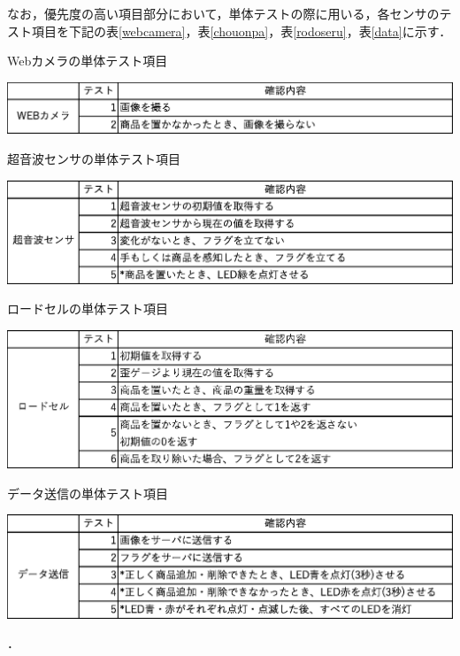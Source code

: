 なお，優先度の高い項目部分において，単体テストの際に用いる，各センサのテスト項目を下記の表\ref{webcamera}，表\ref{chouonpa}，表\ref{rodoseru}，表\ref{data}に示す．

\begin{table}[htbp]
\centering
\caption{Webカメラの単体テスト項目}
\includegraphics[width = 15cm]{./picture/webcamera.eps}
\label{webcamera}
\end{table}

\begin{table}[htbp]
\centering
\caption{超音波センサの単体テスト項目}
\includegraphics[width = 15cm]{./picture/chouonpa.eps}
\label{chouonpa}
\end{table}

\begin{table}[htbp]
\centering
\caption{ロードセルの単体テスト項目}
\includegraphics[width = 15cm]{./picture/rodoseru.eps}
\label{rodoseru}
\end{table}

\begin{table}[htbp]
\centering
\caption{データ送信の単体テスト項目}
\includegraphics[width = 15cm]{./picture/data.eps}
\label{data}
\end{table}．


